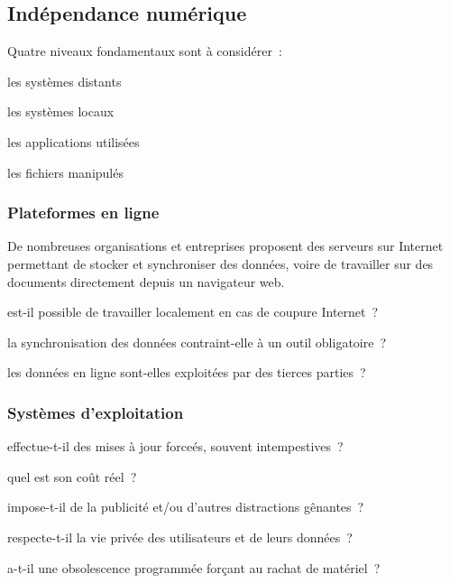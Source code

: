 \subsection{Indépendance numérique}

Quatre niveaux fondamentaux sont à considérer :
\begin{itmz}
\item{les systèmes distants}
\item{les systèmes locaux}
\item{les applications utilisées}
\item{les fichiers manipulés}
\end{itmz}

\subsubsection{Plateformes en ligne}

De nombreuses organisations et entreprises proposent des serveurs sur Internet
permettant de stocker et synchroniser des données, voire de travailler sur des
documents directement depuis un navigateur web.

\begin{itmz}
\item{est-il possible de travailler localement en cas de coupure Internet ?}
\item{la synchronisation des données contraint-elle à un outil obligatoire ?}
\item{les données en ligne sont-elles exploitées par des tierces parties ?}
\end{itmz}

\subsubsection{Systèmes d’exploitation}

\begin{itmz}
\item{effectue-t-il des mises à jour forceés, souvent intempestives ?}
\item{quel est son coût réel ?
    \begin{itmz}
    \item{impose-t-il de la publicité et/ou d’autres distractions gênantes ?}
    \item{respecte-t-il la vie privée des utilisateurs et de leurs données ?}
    \item{a-t-il une obsolescence programmée forçant au rachat de matériel ?}
    \end{itmz}
}
\end{itmz}


